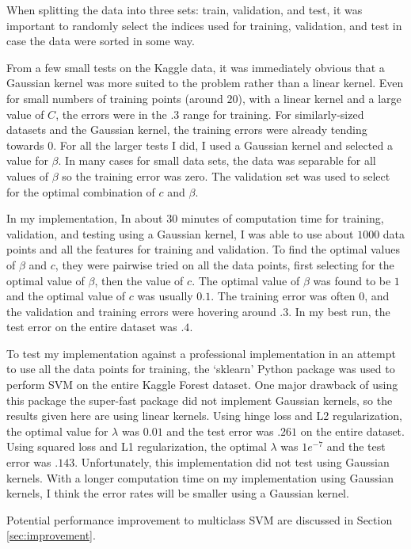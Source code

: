 \documentclass[10pt]{article}
\begin{document}
When splitting the data into three sets: train, validation, and test, it was important to randomly select the indices used for training, validation, and test in case the data were sorted in some way. 

From a few small tests on the Kaggle data, it was immediately obvious that a Gaussian kernel was more suited to the problem rather than a linear kernel. Even for small numbers of training points (around $20$), with a linear kernel and a large value of $C$, the errors were in the $.3$ range for training. For similarly-sized datasets and the Gaussian kernel, the training errors were already tending towards $0$. For all the larger tests I did, I used a Gaussian kernel and selected a value for $\beta$. In many cases for small data sets, the data was separable for all values of $\beta$ so the training error was zero. The validation set was used to select for the optimal combination of $c$ and $\beta$.

In my implementation, In about 30 minutes of computation time for training, validation, and testing using a Gaussian kernel, I was able to use about $1000$ data points and all the features for training and validation. To find the optimal values of $\beta$ and $c$, they were pairwise tried on all the data points, first selecting for the optimal value of $\beta$, then the value of $c$. The optimal value of $\beta$ was found to be $1$ and the optimal value of $c$ was usually $0.1$. The training error was often $0$, and the validation and training errors were hovering around $.3$. In my best run, the test error on the entire dataset was $.4$. 

To test my implementation against a professional implementation in an attempt to use all the data points for training, the `sklearn' Python package was used to perform SVM on the entire Kaggle Forest dataset. One major drawback of using this package the super-fast package did not implement Gaussian kernels, so the results given here are using linear kernels. Using hinge loss and L2 regularization, the optimal value for $\lambda$ was $0.01$ and the test error was $.261$ on the entire dataset. Using squared loss and L1 regularization, the optimal $\lambda$ was $1e^{-7}$ and the test error was $.143$. Unfortunately, this implementation did not test using Gaussian kernels. With a longer computation time on my implementation using Gaussian kernels, I think the error rates will be smaller using a Gaussian kernel.

Potential performance improvement to multiclass SVM are discussed in Section \ref{sec:improvement}.
\end{document}
